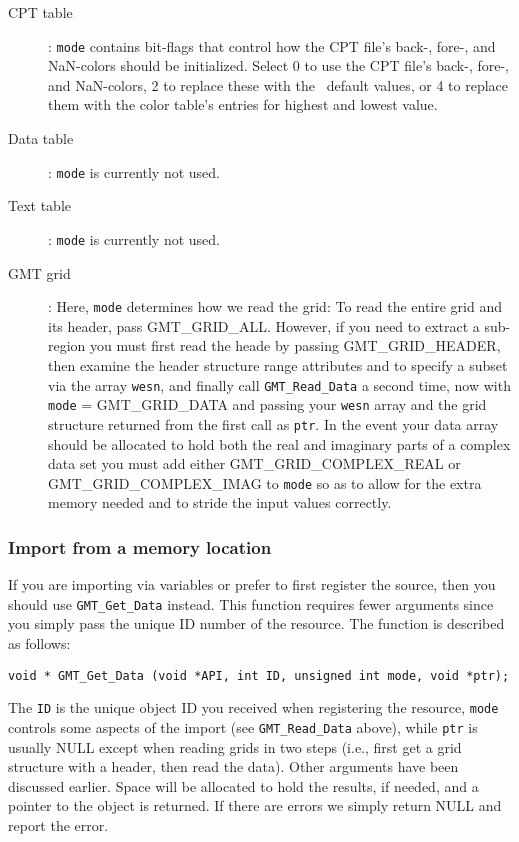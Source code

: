\documentclass[11pt]{report}
\begin{document}
\begin{description}
\item [CPT table]:  \texttt{mode} contains bit-flags that control how the CPT file's back-, fore-, and NaN-colors
should be initialized.  Select 0 to use the CPT file's back-, fore-, and NaN-colors, 2
to replace these with the \GMT\ default values, or 4 to replace them with the color table's
entries for highest and lowest value.
\item [Data table]:  \texttt{mode} is currently not used.
\item [Text table]:  \texttt{mode} is currently not used.
\item [GMT grid]:  Here, \texttt{mode} determines how we read the grid:
To read the entire grid and its header, pass GMT\_GRID\_ALL.  However, if you
need to extract a sub-region you must first read the heade by passing
GMT\_GRID\_HEADER, then examine the header structure range attributes and
to specify a subset via the array \texttt{wesn}, and finally call
\texttt{GMT\_Read\_Data} a second time, now with \texttt{mode} = GMT\_GRID\_DATA and passing your \texttt{wesn} array
and the grid structure returned from the first call as \texttt{ptr}.
In the event your data array should be allocated to hold both the real and imaginary parts of a
complex data set you must add either GMT\_GRID\_COMPLEX\_REAL or GMT\_GRID\_COMPLEX\_IMAG to \texttt{mode}
so as to allow for the extra memory needed and to stride the input values correctly.
\end{description}

\subsubsection{Import from a memory location}

If you are importing via variables or prefer to first register the source, then you
should use \texttt{GMT\_Get\_Data} instead.  This function requires fewer arguments since you simply
pass the unique ID number of the resource.  The function is described as follows:


\begin{verbatim}
void * GMT_Get_Data (void *API, int ID, unsigned int mode, void *ptr);
\end{verbatim}
The \texttt{ID} is the unique object ID you received when registering the resource,
\texttt{mode} controls some aspects of the import (see \texttt{GMT\_Read\_Data} above),
while \texttt{ptr} is usually NULL except when reading grids in two steps
(i.e., first get a grid structure with a header, then read the data).
Other arguments have been discussed earlier.  
Space will be allocated to hold the results, if needed, and a pointer to the object is returned.
If there are errors we simply return NULL and report the error.
\end{document}
